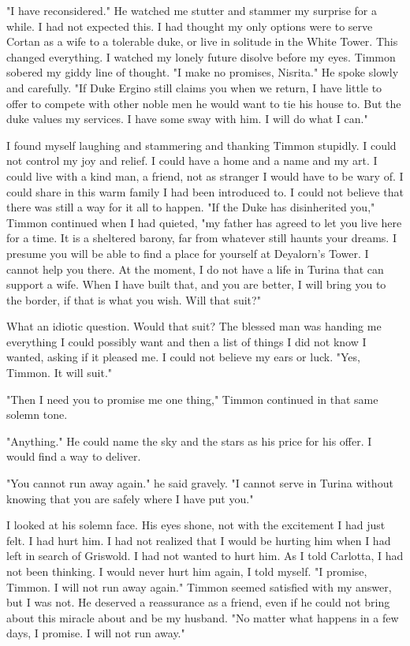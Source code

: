 \documentclass{article}
\begin{document}
"I have reconsidered." He watched me stutter and stammer my surprise for a while. I had not expected this. I had thought my only options were to serve Cortan as a wife to a tolerable duke, or live in solitude in the White Tower. This changed everything. I watched my lonely future disolve before my eyes. Timmon sobered my giddy line of thought. "I make no promises, Nisrita." He spoke slowly and carefully. "If Duke Ergino still claims you when we return, I have little to offer to compete with other noble men he would want to tie his house to. But the duke values my services. I have some sway with him. I will do what I can." 

I found myself laughing and stammering and thanking Timmon stupidly. I could not control my joy and relief. I could have a home and a name and my art. I could live with a kind man, a friend, not as stranger I would have to be wary of. I could share in this warm family I had been introduced to. I could not believe that there was still a way for it all to happen. "If the Duke has disinherited you," Timmon continued when I had quieted, "my father has agreed to let you live here for a time. It is a sheltered barony, far from whatever still haunts your dreams. I presume you will be able to find a place for yourself at Deyalorn's Tower. I cannot help you there. At the moment, I do not have a life in Turina that can support a wife. When I have built that, and you are better, I will bring you to the border, if that is what you wish. Will that suit?"

What an idiotic question. Would that suit? The blessed man was handing me everything I could possibly want and then a list of things I did not know I wanted, asking if it pleased me. I could not believe my ears or luck. "Yes, Timmon. It will suit."

"Then I need you to promise me one thing," Timmon continued in that same solemn tone.

"Anything." He could name the sky and the stars as his price for his offer. I would find a way to deliver.

"You cannot run away again." he said gravely. "I cannot serve in Turina without knowing that you are safely where I have put you."

I looked at his solemn face. His eyes shone, not with the excitement I had just felt. I had hurt him. I had not realized that I would be hurting him when I had left in search of Griswold. I had not wanted to hurt him. As I told Carlotta, I had not been thinking. I would never hurt him again, I told myself. "I promise, Timmon. I will not run away again." Timmon seemed satisfied with my answer, but I was not. He deserved a reassurance as a friend, even if he could not bring about this miracle about and be my husband. "No matter what happens in a few days, I promise. I will not run away."
\end{document}
